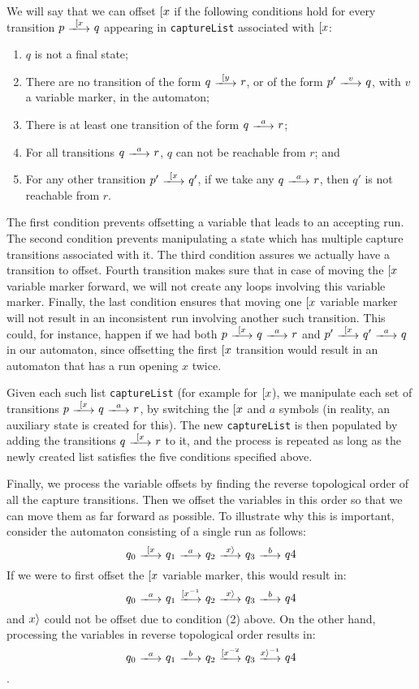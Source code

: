We will say that we can offset $[ x$ if the following conditions hold for
every transition $p\ \longtrans{\Open{x}}\ q$ appearing in \texttt{captureList}
associated with $[ x$:
\begin{enumerate}
	\item $q$ is not a final state;
	\item There are no transition of the form $q\ \longtrans{\Open{y}}\ r$, or
	of the form $p'\ \longtrans{v}\ q$, with $v$ a variable marker, in the
	automaton;
	\item There is at least one transition of the form $q\ \longtrans{a}\ r$;
	\item For all transitions $q\ \longtrans{a}\ r$, $q$ can not be reachable
	from $r$; and
	\item For any other transition $p'\ \longtrans{\Open{x}}\ q'$, if we take
	any $q\ \longtrans{a}\ r$, then $q'$ is not reachable from $r$.
\end{enumerate}

The first condition prevents offsetting a variable that leads to an accepting
run. The second condition prevents manipulating a state which has multiple
capture transitions associated with it. The third condition assures we actually
have a transition to offset. Fourth transition makes sure that in case of moving
the $[ x$ variable marker forward, we will not create any loops involving
this variable marker. Finally, the last condition ensures that moving one
$[ x$ variable marker will not result in an inconsistent run involving
another such transition. This could, for instance, happen if we had both $p\
\longtrans{\Open{x}}\ q\ \longtrans{a}\ r$ and $p'\ \longtrans{\Open{x}}\ q'\
\longtrans{a}\ q$ in our automaton, since offsetting the first $[ x$
transition would result in an automaton that has a run opening $x$ twice.

Given each such list \texttt{captureList} (for example for $[ x$), we
manipulate each set of transitions $p\ \longtrans{\Open{x}}\ q\ \longtrans{a}\
r$, by switching the $[ x$ and $a$ symbols (in reality, an auxiliary state
is created for this). The new \texttt{captureList} is then populated by adding
the transitions $q\ \longtrans{\Open{x}}\ r$ to it, and the process is repeated
as long as the newly created list satisfies the five conditions specified above.

Finally, we process the variable offsets by finding the reverse topological
order of all the capture transitions. Then we offset the variables in this order
so that we can move them as far forward as possible. To illustrate why this is
important, consider the automaton consisting of a single run as follows:
$$q_0\ \longtrans{\Open{x}}\ q_1\ \longtrans{a}\ q_2\ \longtrans{\Close{x}}\
q_3\ \longtrans{b}\ q4$$ If we were to first offset the $[ x$ variable
marker, this would result in:
$$q_0\ \longtrans{a}\ q_1\ \longtrans{\Open{x}^{-1}}\ q_2\
\longtrans{\Close{x}}\ q_3\ \longtrans{b}\ q4$$ and $x \rangle$ could not be
offset due to condition (2) above. On the other hand, processing the variables
in reverse topological order results in:
$$q_0\ \longtrans{a}\ q_1\ \longtrans{b}\ q_2\ \longtrans{\Open{x}^{-2}}\ q_3\
\longtrans{\Close{x}^{-1}}\ q4$$.